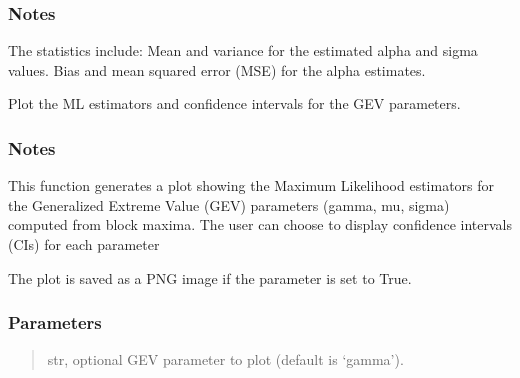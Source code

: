 \documentclass[a4paper,11pt,openany,english]{sphinxmanual}
\begin{document}
\begin{fulllineitems}
\begin{fulllineitems}
\begin{description}
\end{description}


\subsubsection{Notes}
\label{\detokenize{api_topt:id77}}
\sphinxAtStartPar
The statistics include:
\sphinxhyphen{} Mean and variance for the estimated alpha and sigma values.
\sphinxhyphen{} Bias and mean squared error (MSE) for the alpha estimates.

\end{fulllineitems}


\begin{fulllineitems}
\label{\detokenize{api_topt:xtremes.topt.Frechet_ML_estimators.plot}}
\pysigstartsignatures
{}
\pysigstopsignatures
\sphinxAtStartPar
Plot the ML estimators and confidence intervals for the GEV parameters.


\subsubsection{Notes}
\label{\detokenize{api_topt:id78}}
\sphinxAtStartPar
This function generates a plot showing the Maximum Likelihood estimators for the Generalized Extreme Value (GEV) parameters 
(gamma, mu, sigma) computed from block maxima. The user can choose to display confidence intervals (CIs) for each parameter

\sphinxAtStartPar
The plot is saved as a PNG image if the  parameter is set to True.


\subsubsection{Parameters}
\label{\detokenize{api_topt:id79}}\begin{quote}\begin{description}
\sphinxAtStartPar
str, optional
GEV parameter to plot (default is ‘gamma’).


\end{description}
\end{quote}
\end{fulllineitems}
\end{fulllineitems}
\end{document}
